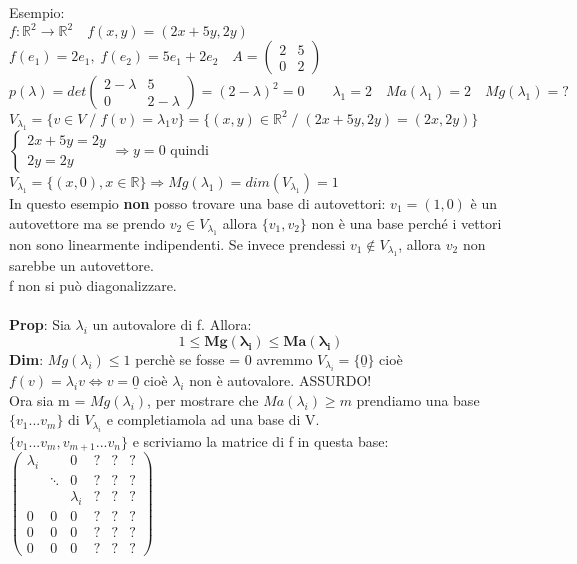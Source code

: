 \documentclass[12pt]{article}
\begin{document}
\noindent Esempio:\\
$f: \mathbb{R}^2 \longrightarrow \mathbb{R}^2 \quad f(x,y) = (2x+5y, 2y)$\\
$f(e_1) = 2e_1, \; f(e_2) = 5e_1 + 2e_2\quad A = \begin{pmatrix}
    2 & 5\\
    0 & 2
\end{pmatrix}$\\
$p(\lambda) = det\begin{pmatrix}
    2-\lambda & 5 \\
    0 & 2-\lambda
\end{pmatrix} = (2-\lambda)^2=0 \quad \quad \lambda_1 = 2\quad Ma(\lambda_1) = 2\quad Mg(\lambda_1)=?$\\
$V_{\lambda_1}=\{v\in V \;/\; f(v) = \lambda_1v\} = \{(x,y) \in \mathbb{R}^2 \;/\; (2x+5y, 2y) = (2x, 2y)\}$\\
$\begin{cases}
    2x+5y = 2y\\
    2y = 2y
\end{cases} \Rightarrow y=0$
quindi $V_{\lambda_1} = \{(x,0), x \in  \mathbb{R}\} \Rightarrow Mg(\lambda_1) = dim(V_{\lambda_1}) = 1$\\
In questo esempio \textbf{non} posso trovare una base di autovettori: $v_1 = (1,0)$ è un autovettore ma se prendo $v_2 \in V_{\lambda_1}$ allora $\{v_1,v_2\}$ non è una base perché i vettori non sono linearmente indipendenti. Se invece prendessi $v_1 \notin V_{\lambda_1}$, allora $v_2$ non sarebbe un autovettore.\\
f non si può diagonalizzare.\\\\
\textbf{Prop}: Sia $\lambda_i$ un autovalore di f. Allora:$$1 \boldsymbol{\leq Mg(\lambda_i) \leq Ma(\lambda_i)}$$
\textbf{Dim}: $Mg(\lambda_i) \leq 1$ perchè se fosse = 0 avremmo $V_{\lambda_i} = \{\underline{0}\}$ cioè $f(v) = \lambda_iv \iff v = \underline{0}$ cioè $\lambda_i$ non è autovalore. ASSURDO!\\
Ora sia m = $Mg(\lambda_i)$, per mostrare che $Ma(\lambda_i)\geq m$ prendiamo una base $\{v_1...v_m\}$ di $V_{\lambda_i}$ e completiamola ad una base di V.\\
$\{v_1...v_m, v_{m+1}...v_n\}$ e scriviamo la matrice di f in questa base:\\
$\begin{pmatrix}
 \lambda_i & & 0 & ? & ? & ?\\
    & \ddots & 0 & ? & ? & ?\\
    & & \lambda_i & ? & ? & ?\\
    0 & 0 & 0 & ? & ? & ?\\
    0 & 0 & 0 & ? & ? & ?\\
    0 & 0 & 0 & ? & ? & ?
\end{pmatrix}$\\\\
\end{document}

